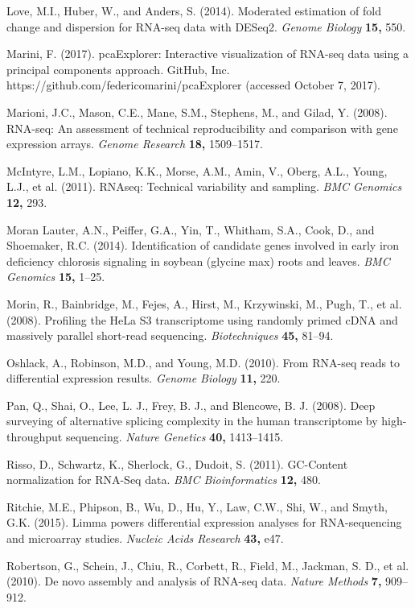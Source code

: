 \documentclass[useAMS,referee]{biom}
\begin{document}
\begin{thebibliography}{}
\bibitem{ } Love, M.I., Huber, W., and Anders, S. (2014). Moderated estimation of fold change and dispersion for RNA-seq data with DESeq2. \textit{Genome Biology} \textbf{15,} 550.

\bibitem{ } Marini, F. (2017). pcaExplorer: Interactive visualization of RNA-seq data using a principal components approach. GitHub, Inc. https://github.com/federicomarini/pcaExplorer (accessed October 7, 2017).

\bibitem{ } Marioni, J.C., Mason, C.E., Mane, S.M., Stephens, M., and Gilad, Y. (2008). RNA-seq: An assessment of technical reproducibility and comparison with gene expression arrays. \textit{Genome Research} \textbf{18,} 1509–1517.

\bibitem{ } McIntyre, L.M., Lopiano, K.K., Morse, A.M., Amin, V., Oberg, A.L., Young, L.J., et al. (2011). RNAseq: Technical variability and sampling. \textit{BMC Genomics} \textbf{12,} 293.

\bibitem{ } Moran Lauter, A.N., Peiffer, G.A., Yin, T., Whitham, S.A., Cook, D., and Shoemaker, R.C. (2014). Identification of candidate genes involved in early iron deficiency chlorosis signaling in soybean (glycine max) roots and leaves. \textit{BMC Genomics} \textbf{15,} 1–25.

\bibitem{ } Morin, R., Bainbridge, M., Fejes, A., Hirst, M., Krzywinski, M., Pugh, T., et al. (2008). Profiling the HeLa S3 transcriptome using randomly primed cDNA and massively parallel short-read sequencing. \textit{Biotechniques} \textbf{45,} 81–94.

\bibitem{ } Oshlack, A., Robinson, M.D., and Young, M.D. (2010). From RNA-seq reads to differential expression results. \textit{Genome Biology} \textbf{11,} 220.

\bibitem{ } Pan, Q., Shai, O., Lee, L. J., Frey, B. J., and Blencowe, B. J. (2008). Deep surveying of alternative splicing complexity in the human transcriptome by high-throughput sequencing. \textit{Nature Genetics} \textbf{40,} 1413–1415.

\bibitem{ } Risso, D., Schwartz, K., Sherlock, G., Dudoit, S. (2011). GC-Content normalization for RNA-Seq data. \textit{BMC Bioinformatics} \textbf{12,} 480.

\bibitem{ } Ritchie, M.E., Phipson, B., Wu, D., Hu, Y., Law, C.W., Shi, W., and Smyth, G.K. (2015). Limma powers differential expression analyses for RNA-sequencing and microarray studies. \textit{Nucleic Acids Research} \textbf{43,} e47.

\bibitem{ } Robertson, G., Schein, J., Chiu, R., Corbett, R., Field, M., Jackman, S. D., et al. (2010). De novo assembly and analysis of RNA-seq data. \textit{Nature Methods} \textbf{7,} 909–912.


\end{thebibliography}
\end{document}
